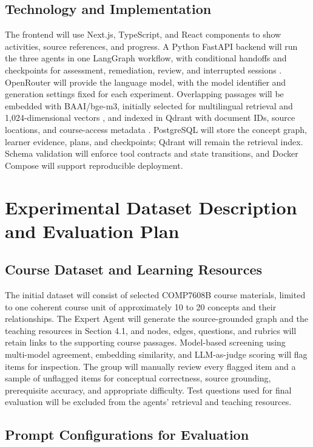 \documentclass{article}
\begin{document}
\subsection{Technology and Implementation}

The frontend will use Next.js, TypeScript, and React components \citep{ref8} to show activities, source references, and progress. A Python FastAPI backend will run the three agents in one LangGraph workflow, with conditional handoffs and checkpoints for assessment, remediation, review, and interrupted sessions \citep{ref9}. OpenRouter will provide the language model, with the model identifier and generation settings fixed for each experiment. Overlapping passages will be embedded with BAAI/bge-m3, initially selected for multilingual retrieval and 1,024-dimensional vectors \citep{ref10}, and indexed in Qdrant with document IDs, source locations, and course-access metadata \citep{ref11}. PostgreSQL will store the concept graph, learner evidence, plans, and checkpoints; Qdrant will remain the retrieval index. Schema validation will enforce tool contracts and state transitions, and Docker Compose will support reproducible deployment.

\section{Experimental Dataset Description and Evaluation Plan}

\subsection{Course Dataset and Learning Resources}

The initial dataset will consist of selected COMP7608B course materials, limited to one coherent course unit of approximately 10 to 20 concepts and their relationships. The Expert Agent will generate the source-grounded graph and the teaching resources in Section 4.1, and nodes, edges, questions, and rubrics will retain links to the supporting course passages. Model-based screening using multi-model agreement, embedding similarity, and LLM-as-judge scoring will flag items for inspection. The group will manually review every flagged item and a sample of unflagged items for conceptual correctness, source grounding, prerequisite accuracy, and appropriate difficulty. Test questions used for final evaluation will be excluded from the agents' retrieval and teaching resources.

\subsection{Prompt Configurations for Evaluation}
\end{document}
